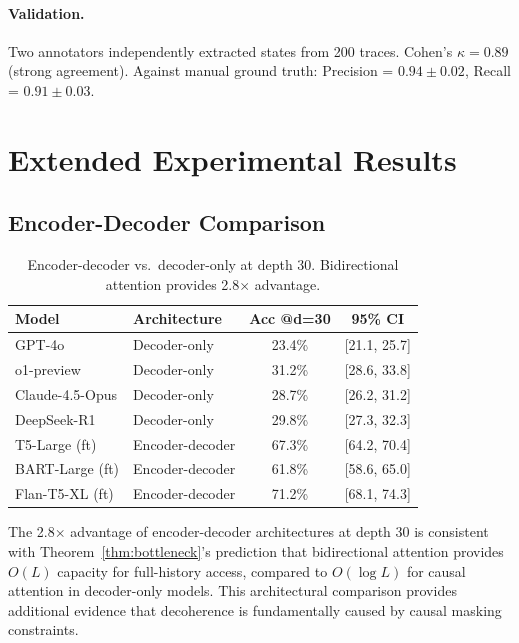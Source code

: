 \documentclass{article}
\theoremstyle{plain}
\theoremstyle{definition}
\theoremstyle{remark}
\begin{document}
\paragraph{Validation.} Two annotators independently extracted states from 200 traces. Cohen's $\kappa = 0.89$ (strong agreement). Against manual ground truth: Precision = $0.94\pm0.02$, Recall = $0.91\pm0.03$.


\section{Extended Experimental Results}
\label{app:results}

\subsection{Encoder-Decoder Comparison}
\label{app:enc_dec}

\begin{table}[h]
\centering
\caption{Encoder-decoder vs.\ decoder-only at depth 30. Bidirectional attention provides 2.8$\times$ advantage.}
\label{tab:enc_dec_full}
\small
\begin{tabular}{@{}llcc@{}}
\toprule
\textbf{Model} & \textbf{Architecture} & \textbf{Acc @d=30} & \textbf{95\% CI} \\
\midrule
GPT-4o & Decoder-only & 23.4\% & [21.1, 25.7] \\
o1-preview & Decoder-only & 31.2\% & [28.6, 33.8] \\
Claude-4.5-Opus & Decoder-only & 28.7\% & [26.2, 31.2] \\
DeepSeek-R1 & Decoder-only & 29.8\% & [27.3, 32.3] \\
T5-Large (ft) & Encoder-decoder & 67.3\% & [64.2, 70.4] \\
BART-Large (ft) & Encoder-decoder & 61.8\% & [58.6, 65.0] \\
Flan-T5-XL (ft) & Encoder-decoder & 71.2\% & [68.1, 74.3] \\
\bottomrule
\end{tabular}
\end{table}

The 2.8$\times$ advantage of encoder-decoder architectures at depth 30 is consistent with Theorem~\ref{thm:bottleneck}'s prediction that bidirectional attention provides $O(L)$ capacity for full-history access, compared to $O(\log L)$ for causal attention in decoder-only models. This architectural comparison provides additional evidence that decoherence is fundamentally caused by causal masking constraints.
\end{document}
